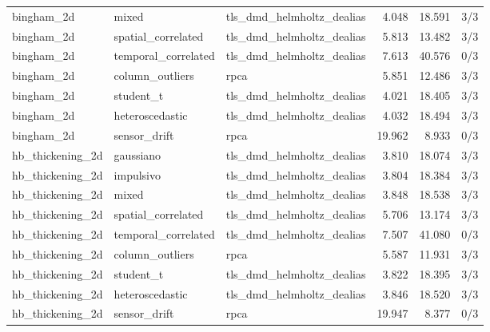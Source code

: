 {\begin{longtable}{p{}p{}p{}rrr}
bingham\_\allowbreak 2d & mixed & tls\_\allowbreak dmd\_\allowbreak helmholtz\_\allowbreak dealias & 4.048 & 18.591 & 3/3 \\
bingham\_\allowbreak 2d & spatial\_\allowbreak correlated & tls\_\allowbreak dmd\_\allowbreak helmholtz\_\allowbreak dealias & 5.813 & 13.482 & 3/3 \\
bingham\_\allowbreak 2d & temporal\_\allowbreak correlated & tls\_\allowbreak dmd\_\allowbreak helmholtz\_\allowbreak dealias & 7.613 & 40.576 & 0/3 \\
bingham\_\allowbreak 2d & column\_\allowbreak outliers & rpca & 5.851 & 12.486 & 3/3 \\
bingham\_\allowbreak 2d & student\_\allowbreak t & tls\_\allowbreak dmd\_\allowbreak helmholtz\_\allowbreak dealias & 4.021 & 18.405 & 3/3 \\
bingham\_\allowbreak 2d & heteroscedastic & tls\_\allowbreak dmd\_\allowbreak helmholtz\_\allowbreak dealias & 4.032 & 18.494 & 3/3 \\
bingham\_\allowbreak 2d & sensor\_\allowbreak drift & rpca & 19.962 & 8.933 & 0/3 \\
hb\_\allowbreak thickening\_\allowbreak 2d & gaussiano & tls\_\allowbreak dmd\_\allowbreak helmholtz\_\allowbreak dealias & 3.810 & 18.074 & 3/3 \\
hb\_\allowbreak thickening\_\allowbreak 2d & impulsivo & tls\_\allowbreak dmd\_\allowbreak helmholtz\_\allowbreak dealias & 3.804 & 18.384 & 3/3 \\
hb\_\allowbreak thickening\_\allowbreak 2d & mixed & tls\_\allowbreak dmd\_\allowbreak helmholtz\_\allowbreak dealias & 3.848 & 18.538 & 3/3 \\
hb\_\allowbreak thickening\_\allowbreak 2d & spatial\_\allowbreak correlated & tls\_\allowbreak dmd\_\allowbreak helmholtz\_\allowbreak dealias & 5.706 & 13.174 & 3/3 \\
hb\_\allowbreak thickening\_\allowbreak 2d & temporal\_\allowbreak correlated & tls\_\allowbreak dmd\_\allowbreak helmholtz\_\allowbreak dealias & 7.507 & 41.080 & 0/3 \\
hb\_\allowbreak thickening\_\allowbreak 2d & column\_\allowbreak outliers & rpca & 5.587 & 11.931 & 3/3 \\
hb\_\allowbreak thickening\_\allowbreak 2d & student\_\allowbreak t & tls\_\allowbreak dmd\_\allowbreak helmholtz\_\allowbreak dealias & 3.822 & 18.395 & 3/3 \\
hb\_\allowbreak thickening\_\allowbreak 2d & heteroscedastic & tls\_\allowbreak dmd\_\allowbreak helmholtz\_\allowbreak dealias & 3.846 & 18.520 & 3/3 \\
hb\_\allowbreak thickening\_\allowbreak 2d & sensor\_\allowbreak drift & rpca & 19.947 & 8.377 & 0/3 \\
\bottomrule\end{longtable}}

